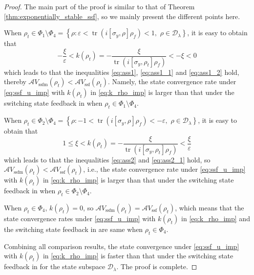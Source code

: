 \documentclass[]{elsarticle}
\begin{document}
\begin{proof}
	The main part of the proof is similar to that of Theorem \ref{thm:exponentially_stable_ssf}, so we mainly present the different points here. 
	
	When $\rho_t\in\Phi_1\setminus\Phi_4=\left\{\rho:\varepsilon<\operatorname{tr}\left(i\left[\sigma_{y}, \rho\right] {\rho_f}\right)<1,\right.$ $\left. \rho\in \mathcal{D}_\lambda\right\}$, it is easy to obtain that 
	$$-\frac{\xi}{\varepsilon}<k\left(\rho_{t}\right)=-\frac{\xi}{\operatorname{tr}\left(i\left[\sigma_{y}, \rho_{t}\right] \rho_f\right)}<-\xi<0$$
	which leads to that the inequalities \eqref{eq:ass1}, \eqref{eq:ass1_1} and \eqref{eq:ass1_2} hold, thereby $\mathcal{A} V_{\mathrm{ssfm}}\left(\rho_{t}\right)<\mathcal{A} V_{\mathrm{ssf}}\left(\rho_{t}\right)$. Namely, the state convergence rate under \eqref{eq:ssf_u_imp} with $k\left(\rho_{t}\right)$ in \eqref{eq:k_rho_imp}  is larger than that under the switching state feedback in \cite{WSJZJ2021b} when $\rho_t\in\Phi_1\setminus\Phi_4$.
	
	When $\rho_t\in\Phi_2\setminus\Phi_4=\left\{\rho:-1<\operatorname{tr}\left(i\left[\sigma_{y}, \rho\right] {\rho_f}\right)<-\varepsilon,\right.$ $\left.\rho\in \mathcal{D}_\lambda\right\}$, it is easy to obtain that 
	$$1\le\xi<k\left(\rho_{t}\right)=-\frac{\xi}{\operatorname{tr}\left(i\left[\sigma_{y}, \rho_{t}\right] \rho_f\right)}<\frac{\xi}{\varepsilon}$$
	which leads to that the inequalities \eqref{eq:ass2} and \eqref{eq:ass2_1} hold, so $\mathcal{A} V_{\mathrm{ssfm}}\left(\rho_{t}\right)<\mathcal{A} V_{\mathrm{ssf}}\left(\rho_{t}\right)$, i.e., the state convergence rate under \eqref{eq:ssf_u_imp} with $k\left(\rho_{t}\right)$ in \eqref{eq:k_rho_imp} is larger than that under the switching state feedback in \cite{WSJZJ2021b} when $\rho_t\in\Phi_2\setminus\Phi_4$.
	
	When $\rho_t\in\Phi_4$, $k\left(\rho_{t}\right)=0$, so $\mathcal{A} V_{\mathrm{ssfm}}\left(\rho_{t}\right)=\mathcal{A} V_{\mathrm{ssf}}\left(\rho_{t}\right)$,
	which means that the state convergence rates under \eqref{eq:ssf_u_imp} with $k\left(\rho_{t}\right)$ in \eqref{eq:k_rho_imp} and the switching state feedback in \cite{WSJZJ2021b} are same when $\rho_{t}\in\Phi_4$.
	
	Combining all comparison results, the state convergence under \eqref{eq:ssf_u_imp} with $k\left(\rho_{t}\right)$ in \eqref{eq:k_rho_imp} is faster than that under the switching state feedback in \cite{WSJZJ2021b} for the state subspace $\mathcal{D}_\lambda$. The proof is complete.
\end{proof}
\end{document}
